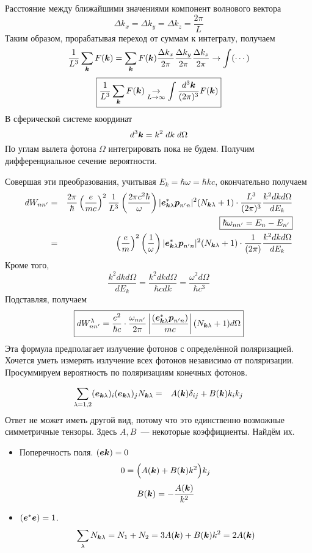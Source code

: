 Расстояние между ближайшими значениями компонент волнового вектора
$$
    \Delta k_x = \Delta k_y = \Delta k_z = \dfrac{2\pi}{L}
$$
Таким образом, прорабатывая переход от суммам к интегралу, получаем
$$
    \dfrac{1}{L^3} \sum_{\bf k} F(\bf k) = \sum_{\bf k} F(\bf k) \dfrac{\Delta k_x}{2 \pi} \dfrac{\Delta k_y}{2 \pi} \dfrac{\Delta k_z}{2 \pi} \to \int (\cdots)
$$
$$
\boxed{
    \dfrac{1}{L^3} \sum_{\bf k} F(\bf k) \underset{L\to \infty}\to \int \dfrac{d^3 \bf k}{(2\pi)^3} F(\bf k)
}
$$
В сферической системе координат
$$
    d^3 \bf k = k^2 \; dk \; d \Omega
$$
По углам вылета фотона $\Omega$ интегрировать пока не будем. Получим дифференциальное сечение вероятности.

Совершая эти преобразования, учитывая $E_k = \hbar \omega = \hbar k c$, окончательно получаем
\begin{eqnarray*}
    d W_{nn'} &=& \dfrac{2 \pi}{\hbar} \left(
        \dfrac{e}{mc}
    \right)^2 \dfrac{1}{L^3} \left(
        \dfrac{2 \pi c^2 \hbar}{\omega}
    \right)
    |\bf e_{\bf k \lambda}^\ast \bf p_{n'n}|^2 (\Nkl + 1) \cdot \dfrac{L^3}{(2\pi)^3} \dfrac{k^2 dk d \Omega}{dE_k}\\
    && \boxed{\hbar \omega_{nn'} = E_n - E_{n'}}\\
    &=& \left(
        \dfrac{e}{m}
    \right)^2 \left(
        \dfrac{1}{\omega}
    \right)
    |\bf e_{\bf k \lambda}^\ast \bf p_{n'n}|^2 (\Nkl + 1) \cdot \dfrac{1}{(2\pi)} \dfrac{k^2 dk d \Omega}{dE_k}
\end{eqnarray*}
Кроме того,
$$
    \dfrac{k^2 dk d \Omega}{d E_k} = \dfrac{k^2 d  k d \Omega}{\hbar c dk} = \dfrac{\omega^2 d \Omega}{\hbar c^3}
$$
Подставляя, получаем
$$
    \boxed{
        d W_{nn'}^{\lambda} = \dfrac{e^2}{\hbar c} \cdot \dfrac{\omega_{nn'}}{2 \pi}
        \left|
            \dfrac{(\bf e_{\bf k \lambda}^\ast \bf p_{n'n})}{mc}
        \right|
        (\Nkl + 1) d \Omega
    }
$$
Эта формула предполагает излучение фотонов с определённой поляризацией. Хочется уметь измерять излучение всех фотонов независимо от поляризации. Просуммируем вероятность по поляризациям конечных фотонов.

\begin{eqnarray*}
    \sum_{\lambda = 1, 2} (\bf e_{\bf k \lambda})_i (\bf e_{\bf k \lambda})_j \Nkl &=&
    A(\bf k) \dta_{ij} + B(\bf k) k_i k_j
\end{eqnarray*}
Ответ не может иметь другой вид, потому что это единственно возможные симметричные тензоры. Здесь $A, B$~--- некоторые коэффициенты. Найдём их.

\begin{itemize}
  \item Поперечность поля. $(\bf e \bf k) = 0$
  $$
    0 =\Big( A(\bf k) + B(\bf k) k^2 \Big) k_j
  $$
  $$
    B(\bf k) = -\dfrac{A(\bf k)}{k^2}
  $$
  \item $(\bf e^{\ast} \bf e) = 1$.
  $$
    \sum_{\lambda} \Nkl = N_1 + N_2 = 3A(\bf k) + B(\bf k) k^2 = 2A(\bf k)
  $$
\end{itemize}

